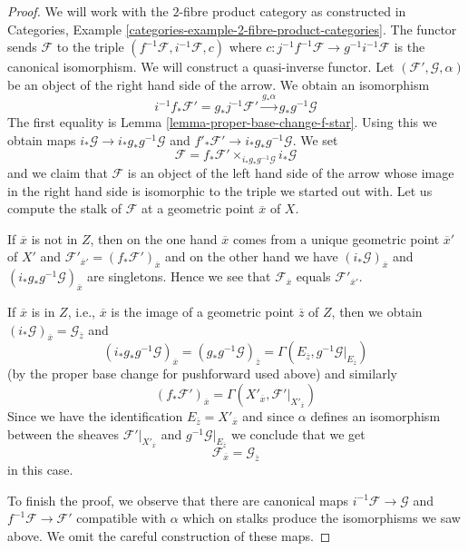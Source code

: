 \documentclass[10pt,a4paper]{amsart}
\theoremstyle{plain}
\theoremstyle{definition}
\theoremstyle{remark}
\numberwithin{equation}{subsection}
\begin{document}
\begin{proof}
We will work with the $2$-fibre product category as constructed in
Categories, Example \ref{categories-example-2-fibre-product-categories}.
The functor sends $\mathcal{F}$ to the triple
$(f^{-1}\mathcal{F}, i^{-1}\mathcal{F}, c)$ where
$c : j^{-1}f^{-1}\mathcal{F} \to g^{-1}i^{-1}\mathcal{F}$
is the canonical isomorphism. We will construct a quasi-inverse functor. Let
$(\mathcal{F}', \mathcal{G}, \alpha)$ be an object
of the right hand side of the arrow.
We obtain an isomorphism
$$
i^{-1}f_*\mathcal{F}' = g_*j^{-1}\mathcal{F}'
\xrightarrow{g_*\alpha}
g_*g^{-1}\mathcal{G}
$$
The first equality is Lemma \ref{lemma-proper-base-change-f-star}.
Using this we obtain maps
$i_*\mathcal{G} \to i_*g_*g^{-1}\mathcal{G}$
and $f'_*\mathcal{F}' \to i_*g_*g^{-1}\mathcal{G}$. We set
$$
\mathcal{F} = f_*\mathcal{F}' \times_{i_*g_*g^{-1}\mathcal{G}} i_*\mathcal{G}
$$
and we claim that $\mathcal{F}$ is an object of the left hand side
of the arrow whose image in the right hand side is isomorphic to
the triple we started out with. Let us compute the stalk of $\mathcal{F}$
at a geometric point $\overline{x}$ of $X$.

\medskip\noindent
If $\overline{x}$ is not
in $Z$, then on the one hand $\overline{x}$ comes from a unique
geometric point $\overline{x}'$ of $X'$ and
$\mathcal{F}'_{\overline{x}'} = (f_*\mathcal{F}')_{\overline{x}}$
and on the other hand we have $(i_*\mathcal{G})_{\overline{x}}$
and $(i_*g_*g^{-1}\mathcal{G})_{\overline{x}}$ are singletons.
Hence we see that $\mathcal{F}_{\overline{x}}$ equals
$\mathcal{F}'_{\overline{x}'}$.

\medskip\noindent
If $\overline{x}$ is in $Z$, i.e., $\overline{x}$ is the image of
a geometric point $\overline{z}$ of $Z$, then we obtain
$(i_*\mathcal{G})_{\overline{x}} = \mathcal{G}_{\overline{z}}$
and
$$
(i_*g_*g^{-1}\mathcal{G})_{\overline{x}} =
(g_*g^{-1}\mathcal{G})_{\overline{z}} =
\Gamma(E_{\overline{z}}, g^{-1}\mathcal{G}|_{E_{\overline{z}}})
$$
(by the proper base change for pushforward used above)
and similarly
$$
(f_*\mathcal{F}')_{\overline{x}} =
\Gamma(X'_{\overline{x}}, \mathcal{F}'|_{X'_{\overline{x}}})
$$
Since we have the identification
$E_{\overline{z}} = X'_{\overline{x}}$ and since $\alpha$
defines an isomorphism between the sheaves
$\mathcal{F}'|_{X'_{\overline{x}}}$ and
$g^{-1}\mathcal{G}|_{E_{\overline{z}}}$
we conclude that we get
$$
\mathcal{F}_{\overline{x}} = \mathcal{G}_{\overline{z}}
$$
in this case.

\medskip\noindent
To finish the proof, we observe that there are canonical maps
$i^{-1}\mathcal{F} \to \mathcal{G}$ and $f^{-1}\mathcal{F} \to \mathcal{F}'$
compatible with $\alpha$ which on stalks produce the isomorphisms
we saw above. We omit the careful construction of these maps.
\end{proof}
\end{document}
